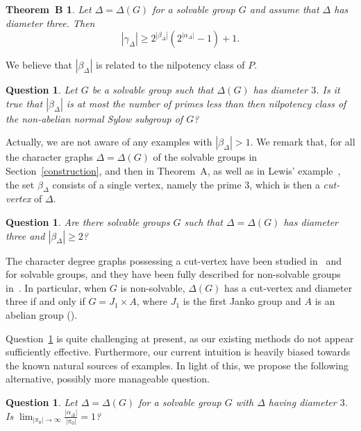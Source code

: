 \documentclass{amsart}
\newtheorem*{thmB}{Theorem~B}
\newtheorem{question}[theorem]{Question}
\begin{document}
\begin{thmB}
  Let $\Delta = \Delta(G)$  for a solvable group $G$ and assume that $\Delta$ has diameter three.
  Then
  $$|\gamma_{\Delta}| \geq 2^{|\beta_{\Delta}|}\left( 2^{|\alpha_{\Delta}|} -1  \right) + 1 .$$
\end{thmB}


We believe that $|\beta_\Delta|$ is related to the nilpotency class of $P$.
\begin{question}\label{q111}
Let $G$ be a solvable group such that $\Delta(G)$ has diameter $3$.  Is it true that $|\beta_\Delta|$ is at most the number of primes less than then nilpotency class of the non-abelian normal Sylow subgroup of $G$?
\end{question}



Actually, we are not aware of any examples with $|\beta_{\Delta}| > 1$. We remark that, for all the character graphs $\Delta = \Delta(G)$ of the solvable groups in Section~\ref{construction}, and then in Theorem~A,
as well as in Lewis' example~\cite{lewis1}, the set $\beta_{\Delta}$ consists of a single vertex, namely the prime $3$,  which is then a \emph{cut-vertex}
of $\Delta$.

\begin{question}\label{q1}
  Are there solvable groups $G$ such that $\Delta = \Delta(G)$ has diameter three and $|\beta_{\Delta}| \geq 2$?
\end{question}

The character degree graphs possessing  a cut-vertex have been studied in~\cite{HHHI} and \cite{LM} for solvable groups, and they
have been fully described for non-solvable groups in~\cite{DPSS}.
In particular, when $G$ is non-solvable, $\Delta(G)$ has a cut-vertex and diameter three if and only if
$G = J_1 \times A$, where $J_1$ is the first Janko group and  $A$ is an abelian group (\cite[Theorem~A(d)]{DPSS}).

Question~\ref{q1} is quite challenging at present, as our existing methods do not appear sufficiently effective. Furthermore, our current intuition is  heavily biased towards the known natural sources of examples. In light of this, we propose the following alternative, possibly more manageable question.
\begin{question}\label{q1a}
  Let $\Delta = \Delta(G)$ for a solvable group $G$ with $\Delta$ having diameter $3$. Is $\lim_{|\pi_0|\to\infty}\frac{|\alpha_\Delta|}{|\pi_0|}=1$?
\end{question}
\end{document}
